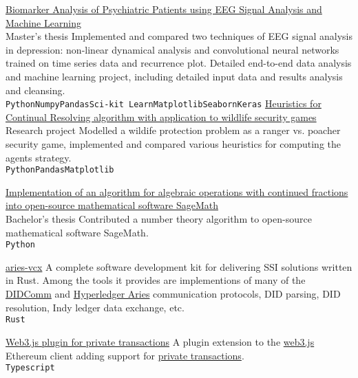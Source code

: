 \documentclass[9pt]{developercv} %
\begin{document}
\begin{entrylist}
	\entry
		{}
		{\href{https://www.scribd.com/document/414005885/Biomarker-Analysis-of-Psychiatric-Patients-using-EEG-Signal-Analysis-and-Machine-Learning}{Biomarker Analysis of Psychiatric Patients using EEG Signal Analysis and Machine Learning}}
		{\\Master's thesis}
		{Implemented and compared two techniques of EEG signal analysis in depression: non-linear dynamical analysis and convolutional neural networks trained on time series data and recurrence plot. Detailed end-to-end data analysis and machine learning project, including detailed input data and results analysis and cleansing. \\
         \texttt{Python}\slashsep\texttt{Numpy}\slashsep\texttt{Pandas}\slashsep\texttt{Sci-kit Learn}\slashsep\texttt{Matplotlib}\slashsep\texttt{Seaborn}\slashsep\texttt{Keras}}
	\entry
		{}
		{\href{https://www.scribd.com/document/372696825/Continual-resolving-heuristics-for-the-PAWS-domain}{Heuristics for Continual Resolving algorithm with application to wildlife security games}}
		{\\Research project}
		{Modelled a wildife protection problem as a ranger vs. poacher security game, implemented and compared various heuristics for computing the agents strategy.\\
         \texttt{Python}\slashsep\texttt{Pandas}\slashsep\texttt{Matplotlib}
        }

	\entry
		{}
		{\href{}{Implementation of an algorithm for algebraic operations with continued fractions into open-source mathematical software SageMath}}
		{\\Bachelor's thesis}
		{Contributed a number theory algorithm to open-source mathematical software SageMath.
         \\\texttt{Python}
        }

	\entry
		{}
		{\href{https://github.com/hyperledger/aries-vcx}{aries-vcx}}
		{}
    {A complete software development kit for delivering SSI solutions written in Rust. Among the tools it provides are implementions of many of the \href{https://didcomm.org/}{DIDComm} and \href{https://github.com/hyperledger/aries}{Hyperledger Aries} communication protocols, DID parsing, DID resolution, Indy ledger data exchange, etc.\\
         \texttt{Rust}}

	\entry
		{}
		{\href{https://github.com/mirgee/web3-plugin-private}{Web3.js plugin for private transactions}}
		{}
    {A plugin extension to the \href{https://github.com/web3/web3.js}{web3.js} Ethereum client adding support for \href{https://besu.hyperledger.org/development/private-networks/concepts/privacy/private-transactions}{private transactions}.\\
         \texttt{Typescript}}


\end{entrylist}
\end{document}
